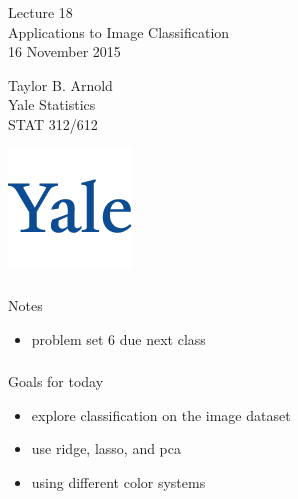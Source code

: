 



\begin{frame}[fragile] \frametitle{}

\vfill

{\fontsize{0.7cm}{0cm}\selectfont Lecture 18 \\\vspace{0.2cm}
Applications to Image Classification}\\\vspace{0.5cm}
16 November 2015

\vspace{2cm}

\begin{minipage}{0.6\textwidth}
Taylor B. Arnold \\
Yale Statistics \\
STAT 312/612
\end{minipage}
\hfill
\begin{minipage}{0.3\textwidth}\raggedleft
\includegraphics[scale=0.3]{../yale-logo.png}
\end{minipage}%

\end{frame}

\begin{frame}[fragile] \frametitle{}

{\color{yaleblue}\fontsize{16pt}{20pt}\selectfont Notes}

\begin{itemize}
\item problem set 6 due next class
\end{itemize}

\end{frame}

\begin{frame}[fragile] \frametitle{}

{\color{yaleblue}\fontsize{16pt}{20pt}\selectfont Goals for today}

\begin{itemize}
\item explore classification on the image dataset
\item use ridge, lasso, and pca
\item using different color systems
\end{itemize}

\end{frame}














